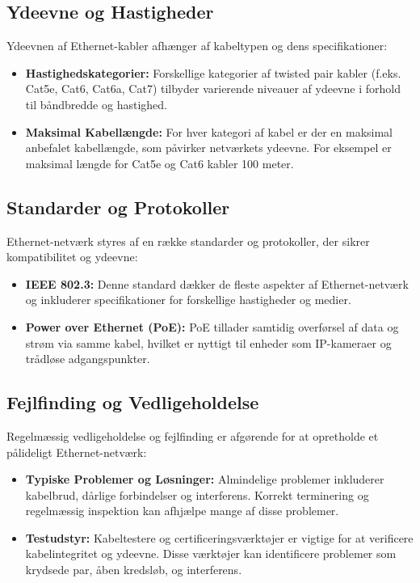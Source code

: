 \subsection{Ydeevne og Hastigheder}
Ydeevnen af Ethernet-kabler afhænger af kabeltypen og dens specifikationer:
\begin{itemize}
	\item \textbf{Hastighedskategorier:} Forskellige kategorier af twisted pair kabler (f.eks. Cat5e, Cat6, Cat6a, Cat7) tilbyder varierende niveauer af ydeevne i forhold til båndbredde og hastighed.
	\item \textbf{Maksimal Kabellængde:} For hver kategori af kabel er der en maksimal anbefalet kabellængde, som påvirker netværkets ydeevne. For eksempel er maksimal længde for Cat5e og Cat6 kabler 100 meter.
\end{itemize}

\subsection{Standarder og Protokoller}
Ethernet-netværk styres af en række standarder og protokoller, der sikrer kompatibilitet og ydeevne:
\begin{itemize}
	\item \textbf{IEEE 802.3:} Denne standard dækker de fleste aspekter af Ethernet-netværk og inkluderer specifikationer for forskellige hastigheder og medier.
	\item \textbf{Power over Ethernet (PoE):} PoE tillader samtidig overførsel af data og strøm via samme kabel, hvilket er nyttigt til enheder som IP-kameraer og trådløse adgangspunkter.
\end{itemize}

\subsection{Fejlfinding og Vedligeholdelse}
Regelmæssig vedligeholdelse og fejlfinding er afgørende for at opretholde et pålideligt Ethernet-netværk:
\begin{itemize}
	\item \textbf{Typiske Problemer og Løsninger:} Almindelige problemer inkluderer kabelbrud, dårlige forbindelser og interferens. Korrekt terminering og regelmæssig inspektion kan afhjælpe mange af disse problemer.
	\item \textbf{Testudstyr:} Kabeltestere og certificeringsværktøjer er vigtige for at verificere kabelintegritet og ydeevne. Disse værktøjer kan identificere problemer som krydsede par, åben kredsløb, og interferens.
\end{itemize}

